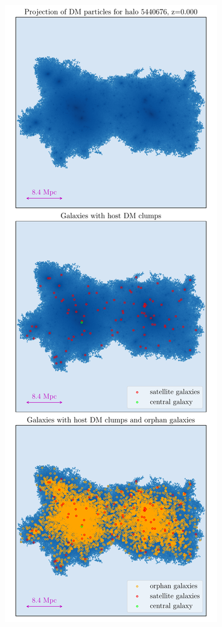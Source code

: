 \begin{figure}[p]
    \endminipage
    \hspace*{\fill}
        \includegraphics[width=\textwidth]{./images/galaxies/100MPC/vertical-halostats_image_output_00041-halo-5440676.pdf}

\end{figure}
